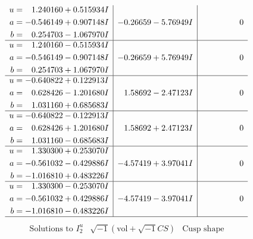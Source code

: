 \documentclass[1p]{elsarticle_modified}
\theoremstyle{definition}
\newcommand{\I}{\sqrt{-1}}
\begin{document}
$$\begin{array}{c|c|c}
\begin{aligned}
u &= \phantom{-}1.240160 + 0.515934 I \\
a &= -0.546149 + 0.907148 I \\
b &= \phantom{-}0.254703 - 1.067970 I\end{aligned}
 & -0.26659 - 5.76949 I & \phantom{-0.000000 } 0 \\ \hline\begin{aligned}
u &= \phantom{-}1.240160 - 0.515934 I \\
a &= -0.546149 - 0.907148 I \\
b &= \phantom{-}0.254703 + 1.067970 I\end{aligned}
 & -0.26659 + 5.76949 I & \phantom{-0.000000 } 0 \\ \hline\begin{aligned}
u &= -0.640822 + 0.122913 I \\
a &= \phantom{-}0.628426 - 1.201680 I \\
b &= \phantom{-}1.031160 + 0.685683 I\end{aligned}
 & \phantom{-}1.58692 - 2.47123 I & \phantom{-0.000000 } 0 \\ \hline\begin{aligned}
u &= -0.640822 - 0.122913 I \\
a &= \phantom{-}0.628426 + 1.201680 I \\
b &= \phantom{-}1.031160 - 0.685683 I\end{aligned}
 & \phantom{-}1.58692 + 2.47123 I & \phantom{-0.000000 } 0 \\ \hline\begin{aligned}
u &= \phantom{-}1.330300 + 0.253070 I \\
a &= -0.561032 - 0.429886 I \\
b &= -1.016810 + 0.483226 I\end{aligned}
 & -4.57419 + 3.97041 I & \phantom{-0.000000 } 0 \\ \hline\begin{aligned}
u &= \phantom{-}1.330300 - 0.253070 I \\
a &= -0.561032 + 0.429886 I \\
b &= -1.016810 - 0.483226 I\end{aligned}
 & -4.57419 - 3.97041 I & \phantom{-0.000000 } 0\\
 \hline 
 \end{array}$$\newpage$$\begin{array}{c|c|c}  
\text{Solutions to }I^u_{2}& \I (\text{vol} + \sqrt{-1}CS) & \text{Cusp shape}\\
 \hline 
\begin{aligned}

\end{aligned}
\end{array}$$
\end{document}

